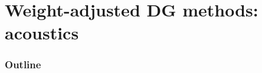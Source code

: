 \documentclass[compress]{beamer}
\begin{document}
%
%

\section{Weight-adjusted DG methods: acoustics}

\begin{frame}[noframenumbering]
  \frametitle{Outline}
\end{frame}
\end{document}
